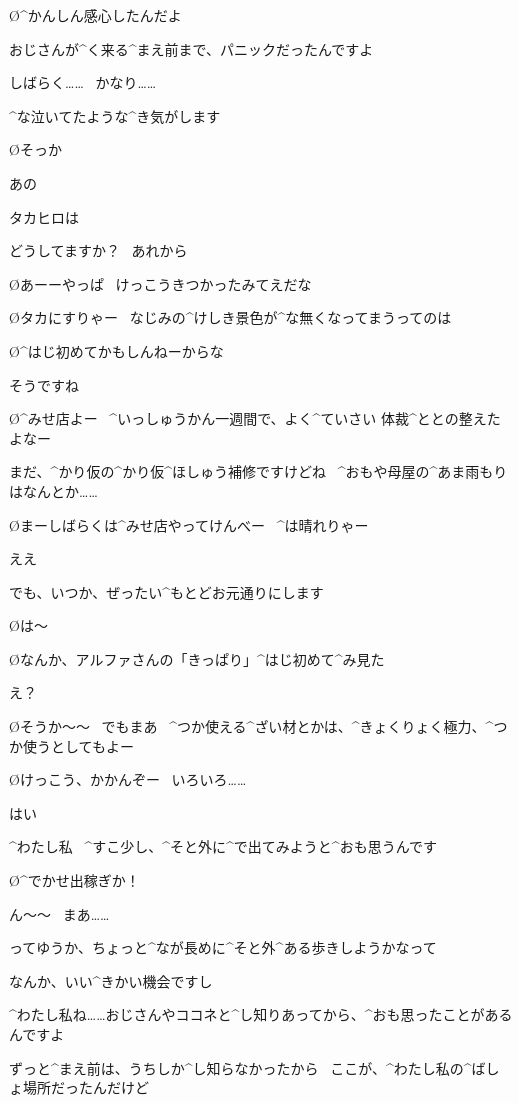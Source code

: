 \O ^{かんしん}{感心}したんだよ

\A おじさんが^{く}{来}る^{まえ}{前}まで、パニックだったんですよ

\A しばらく……
\ かなり……

\A ^{な}{泣}いてたような^{き}{気}がします

\page
\O そっか

\A あの

\A タカヒロは

\A どうしてますか？
\ あれから

\page
\O あーーやっぱ
\ けっこうきつかったみてえだな

\O タカにすりゃー
\ なじみの^{けしき}{景色}が^{な}{無}くなってまうってのは

\O ^{はじ}{初}めてかもしんねーからな

\A そうですね

\page
\O ^{みせ}{店}よー
\ ^{いっしゅうかん}{一週間}で、よく^{ていさい }{体裁}^{ととの}{整}えたよなー

\A まだ、^{かり}{仮}の^{かり}{仮}^{ほしゅう}{補修}ですけどね
\ ^{おもや}{母屋}の^{あま}{雨}もりはなんとか……

\O まーしばらくは^{みせ}{店}やってけんべー
\ ^{は}{晴}れりゃー

\A ええ

\A でも、いつか、ぜったい^{もとどお}{元通}りにします

\page
\O は〜

\O なんか、アルファさんの「きっぱり」^{はじ}{初}めて^{み}{見}た

\A え？

\O そうか〜〜
\ でもまあ
\ ^{つか}{使}える^{ざい}{材}とかは、^{きょくりょく}{極力}、^{つか}{使}うとしてもよー

\O けっこう、かかんぞー
\ いろいろ……

\A はい

\page
\A ^{わたし}{私}
\ ^{すこ}{少}し、^{そと}{外}に^{で}{出}てみようと^{おも}{思}うんです

\O ^{でかせ}{出稼}ぎか！

\A ん〜〜
\ まあ……

\A ってゆうか、ちょっと^{なが}{長}めに^{そと}{外}^{ある}{歩}きしようかなって

\page
\A なんか、いい^{きかい}{機会}ですし

\A ^{わたし}{私}ね……おじさんやココネと^{し}{知}りあってから、^{おも}{思}ったことがあるんですよ

\A ずっと^{まえ}{前}は、うちしか^{し}{知}らなかったから
\ ここが、^{わたし}{私}の^{ばしょ}{場所}だったんだけど

